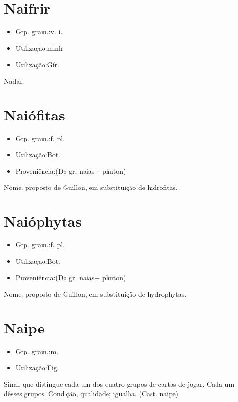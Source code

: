 \section{Naifrir}
\begin{itemize}
\item {Grp. gram.:v. i.}
\end{itemize}
\begin{itemize}
\item {Utilização:minh}
\end{itemize}
\begin{itemize}
\item {Utilização:Gír.}
\end{itemize}
Nadar.
\section{Naiófitas}
\begin{itemize}
\item {Grp. gram.:f. pl.}
\end{itemize}
\begin{itemize}
\item {Utilização:Bot.}
\end{itemize}
\begin{itemize}
\item {Proveniência:(Do gr. \textunderscore naias\textunderscore  + \textunderscore phuton\textunderscore )}
\end{itemize}
Nome, proposto de Guillon, em substituição de \textunderscore hidrofitas\textunderscore .
\section{Naióphytas}
\begin{itemize}
\item {Grp. gram.:f. pl.}
\end{itemize}
\begin{itemize}
\item {Utilização:Bot.}
\end{itemize}
\begin{itemize}
\item {Proveniência:(Do gr. \textunderscore naias\textunderscore  + \textunderscore phuton\textunderscore )}
\end{itemize}
Nome, proposto de Guillon, em substituição de \textunderscore hydrophytas\textunderscore .
\section{Naipe}
\begin{itemize}
\item {Grp. gram.:m.}
\end{itemize}
\begin{itemize}
\item {Utilização:Fig.}
\end{itemize}
Sinal, que distingue cada um dos quatro grupos de cartas de jogar.
Cada um dêsses grupos.
Condição, qualidade; igualha.
(Cast. \textunderscore naipe\textunderscore )
